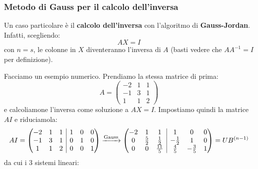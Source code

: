 \documentclass[a4paper,11pt]{article}
\begin{document}
\subsubsection{Metodo di Gauss per il calcolo dell'inversa}
Un caso particolare è il \textbf{calcolo dell'inversa} con l'algoritmo di \textbf{Gauss-Jordan}.
Infatti, scegliendo:
$$
AX = I
$$
con $n = s$, le colonne in $X$ diventeranno l'inversa di $A$ (basti vedere che $A A^{-1} = I$ per definizione).

\par\smallskip

Facciamo un esempio numerico.
Prendiamo la stessa matrice di prima:
$$
A = \begin{pmatrix}
	-2 & 1 & 1 \\ 
	-1 & 3 & 1 \\ 
	1 & 1 & 2
\end{pmatrix}
$$
e calcoliamone l'inversa come soluzione a $AX = I$.
Impostiamo quindi la matrice $AI$ e riduciamola:
$$
AI = 
\left(\begin{array}{@{}c c c | c c c@{}}
		-2 & 1 & 1 & 1 & 0 & 0 \\
		-1 & 3 & 1 & 0 & 1 & 0 \\
		1 & 1 & 2 & 0 & 0 & 1
\end{array}\right) \xrightarrow{\text{Gauss}}
\left(\begin{array}{@{}c c c | c c c @{}}
		-2 & 1 & 1 & 1 & 0 & 0 \\
		0 & \frac{5}{2} & \frac{1}{2} & -\frac{1}{2} & 1 & 0 \\ 
	0 & 0 & \frac{11}{5} & \frac{4}{5} & -\frac{3}{5} & 1
\end{array}\right) = UB^{(n - 1)}
$$
da cui i 3 sistemi lineari:
\end{document}
